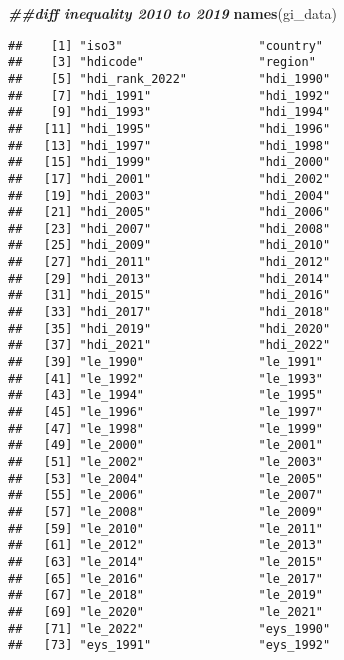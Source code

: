\documentclass[
]{article}
\newenvironment{Shaded}{\begin{snugshade}}{\end{snugshade}}
\newcommand{\DocumentationTok}[1]{\textcolor[rgb]{0.56,0.35,0.01}{\textbf{\textit{#1}}}}
\newcommand{\FunctionTok}[1]{\textcolor[rgb]{0.13,0.29,0.53}{\textbf{#1}}}
\newcommand{\NormalTok}[1]{#1}
\begin{document}
\begin{Shaded}
\begin{Highlighting}[]
\DocumentationTok{\#\#diff inequality 2010 to 2019}
\FunctionTok{names}\NormalTok{(gi\_data)}
\end{Highlighting}
\end{Shaded}

\begin{verbatim}
##    [1] "iso3"                   "country"               
##    [3] "hdicode"                "region"                
##    [5] "hdi_rank_2022"          "hdi_1990"              
##    [7] "hdi_1991"               "hdi_1992"              
##    [9] "hdi_1993"               "hdi_1994"              
##   [11] "hdi_1995"               "hdi_1996"              
##   [13] "hdi_1997"               "hdi_1998"              
##   [15] "hdi_1999"               "hdi_2000"              
##   [17] "hdi_2001"               "hdi_2002"              
##   [19] "hdi_2003"               "hdi_2004"              
##   [21] "hdi_2005"               "hdi_2006"              
##   [23] "hdi_2007"               "hdi_2008"              
##   [25] "hdi_2009"               "hdi_2010"              
##   [27] "hdi_2011"               "hdi_2012"              
##   [29] "hdi_2013"               "hdi_2014"              
##   [31] "hdi_2015"               "hdi_2016"              
##   [33] "hdi_2017"               "hdi_2018"              
##   [35] "hdi_2019"               "hdi_2020"              
##   [37] "hdi_2021"               "hdi_2022"              
##   [39] "le_1990"                "le_1991"               
##   [41] "le_1992"                "le_1993"               
##   [43] "le_1994"                "le_1995"               
##   [45] "le_1996"                "le_1997"               
##   [47] "le_1998"                "le_1999"               
##   [49] "le_2000"                "le_2001"               
##   [51] "le_2002"                "le_2003"               
##   [53] "le_2004"                "le_2005"               
##   [55] "le_2006"                "le_2007"               
##   [57] "le_2008"                "le_2009"               
##   [59] "le_2010"                "le_2011"               
##   [61] "le_2012"                "le_2013"               
##   [63] "le_2014"                "le_2015"               
##   [65] "le_2016"                "le_2017"               
##   [67] "le_2018"                "le_2019"               
##   [69] "le_2020"                "le_2021"               
##   [71] "le_2022"                "eys_1990"              
##   [73] "eys_1991"               "eys_1992"              

\end{verbatim}
\end{document}
